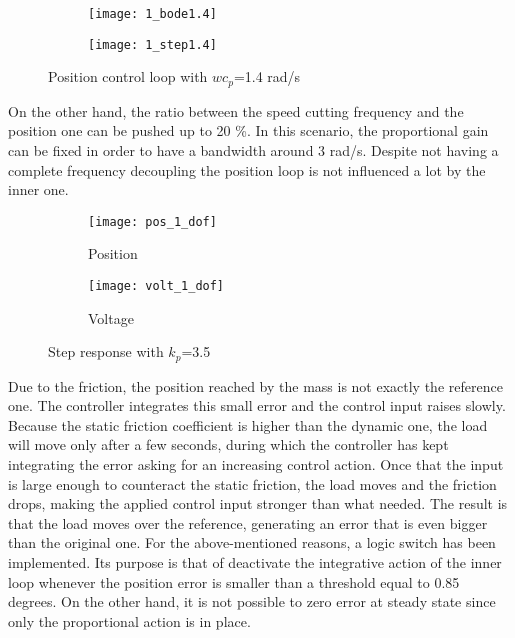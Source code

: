 \begin{figure*}[h]
	\centering
	\begin{subfigure}{0.45\columnwidth}
		\texttt{[image: 1\_bode1.4]}
	\end{subfigure}
	\begin{subfigure}{0.45\columnwidth}
		\texttt{[image: 1\_step1.4]}
	\end{subfigure}
	\caption{Position control loop with  $wc_{p} $=1.4 rad/s}
	\label{fig:Bode and Step P 1.4}
\end{figure*}

On the other hand, the ratio between the speed cutting frequency and the position one can be pushed up to 20 \%. In this scenario, the proportional gain can be fixed in order to have a bandwidth around 3 rad/s. Despite not having a complete frequency decoupling the position loop is not influenced a lot by the inner one.


\begin{figure*}[h]
	\centering
	\begin{subfigure}{0.45\columnwidth}
		\texttt{[image: pos\_1\_dof]}
		\caption{Position}
	\end{subfigure}
	\begin{subfigure}{0.45\columnwidth}
		\texttt{[image: volt\_1\_dof]}
		\caption{Voltage}
	\end{subfigure}
	\caption{Step response with $k_{p} $=3.5}
	\label{fig:Pos_1dof_3.5}
\end{figure*}

Due to the friction, the position reached by the mass is not exactly the reference one. The controller integrates this small error and the control input raises slowly. Because the static friction coefficient is higher than the dynamic one, the load will move only after a few seconds, during which the controller has kept integrating the error asking for an increasing control action.
Once that the input is large enough to counteract the static friction, the load moves and the friction drops, making the applied control input stronger than what needed. The result is that the load moves over the reference, generating an error that is even bigger than the original one.
For the above-mentioned reasons, a logic switch has been implemented. Its purpose is that of deactivate the integrative action of the inner loop whenever the position error is smaller than a threshold equal to 0.85 degrees. On the other hand, it is not possible to zero error at steady state since only the proportional action is in place.

